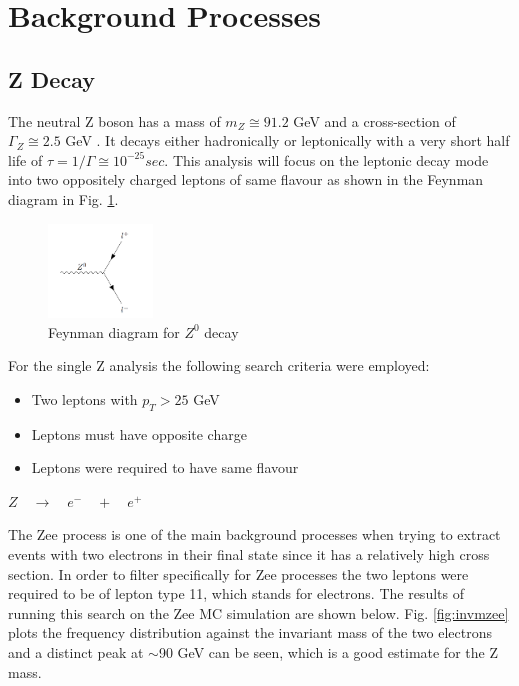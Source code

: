 \documentclass[runningheads,a4paper]{llncs}
\begin{document}
\section{Background Processes}

\subsection{Z Decay}

The neutral Z boson has a mass of $m_{Z}\cong91.2$ GeV and a cross-section of $\Gamma_{Z}\cong2.5$ GeV \cite{BeringerZ}. It decays either hadronically or leptonically with a very short half life of $\tau = 1/\Gamma\cong{ 10 }^{ -25 }sec$. This analysis will focus on the leptonic decay mode into two oppositely charged leptons of same flavour as shown in the Feynman diagram in Fig. \ref{fig:feynmzll}.\\

\begin{figure}
\centering
\includegraphics[height=2.5cm]{feynm_Z}
\caption{Feynman diagram for ${Z}^{0}$ decay}
\label{fig:feynmzll}
\end{figure}

For the single Z analysis the following search criteria were employed:
\begin{itemize}
\item Two leptons with ${p}_{T} > 25$ GeV
\item Leptons must have opposite charge
\item Leptons were required to have same flavour
\end{itemize}
\pagebreak
\begin{flushleft}
\textbf{$Z \quad \rightarrow \quad { e }^{ - } \quad + \quad { e }^{ + }$}
\end{flushleft}

The Zee process is one of the main background processes when trying to extract events with two electrons in their final state since it has a relatively high cross section. In order to filter specifically for Zee processes the two leptons were required to be of lepton type 11, which stands for electrons. The results of running this search on the Zee MC simulation are shown below. Fig. \ref{fig:invmzee} plots the frequency distribution against the invariant mass of the two electrons and a distinct peak at $\sim$90 GeV can be seen, which is a good estimate for the Z mass.\\
\end{document}
